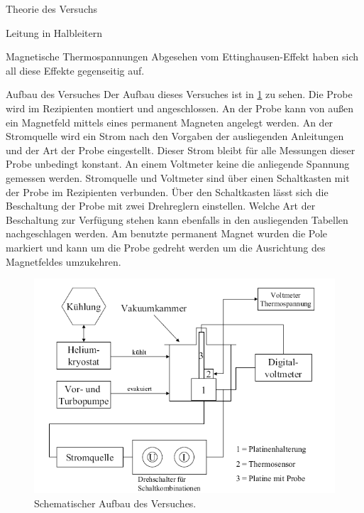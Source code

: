 \documentclass[pdftex, a4paper,11pt, twoside, ngerman]{report}
\begin{document}
\begin{chapter}{Theorie des Versuchs}
\begin{section}{Leitung in Halbleitern}
\begin{subsection}{Magnetische Thermospannungen}
                Abgesehen vom Ettinghausen-Effekt haben sich all diese Effekte gegenseitig auf.

        \end{subsection}

    \end{section}
    
    
  \end{chapter}
         
         
         
  \begin{chapter}{Aufbau des Versuches}
    \label{chp:Aufbau}
    Der Aufbau dieses Versuches ist in \cref{fig:Aufbau} zu sehen.
    Die Probe wird im Rezipienten montiert und angeschlossen.
    An der Probe kann von außen ein Magnetfeld mittels eines permanent Magneten
    angelegt werden. An der Stromquelle wird ein Strom nach den Vorgaben der
    ausliegenden Anleitungen und der Art der Probe eingestellt.
    Dieser Strom bleibt für alle Messungen dieser Probe unbedingt konstant.
    An einem Voltmeter keine die anliegende Spannung gemessen werden.
    Stromquelle und Voltmeter sind über einen Schaltkasten mit der Probe im
    Rezipienten verbunden.
    Über den Schaltkasten lässt sich die Beschaltung der Probe mit zwei
    Drehreglern einstellen.
    Welche Art der Beschaltung zur Verfügung stehen kann ebenfalls in den
    ausliegenden Tabellen nachgeschlagen werden.
    Am benutzte permanent Magnet wurden die Pole markiert und kann um die Probe
    gedreht werden um die Ausrichtung des Magnetfeldes umzukehren.
    
    \begin{figure}[ht!]
      \centering
      \includegraphics[width=\textwidth]{Figures/Aufbau.png}
      \caption{Schematischer Aufbau des Versuches.}
      \label{fig:Aufbau}
    \end{figure}
    

\end{chapter}
\end{document}
